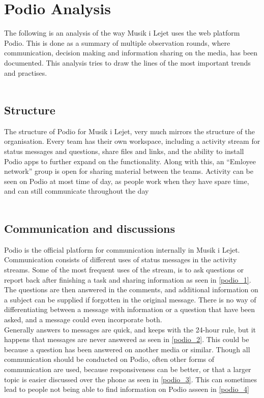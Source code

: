 \section{Podio Analysis}
\label{podio}

The following is an analysis of the way Musik i Lejet uses the web platform Podio. This is done as a summary of multiple observation rounds, where communication, decision making and information sharing on the media, has been documented. This analysis tries to draw the lines of the most important trends and practises. \\ \\

\subsection{Structure}
\label{podio_struc}
The structure of Podio for Musik i Lejet, very much mirrors the structure of the organisation. Every team has their own workspace, including a activity stream for status messages and questions, share files and links, and the ability to install Podio apps to further expand on the functionality. Along with this, an ``Emloyee network'' group is open for sharing material between the teams. Activity can be seen on Podio at most time of day, as people work when they have spare time, and can still communicate throughout the day\\ \\

\subsection{Communication and discussions}
\label{podio_com}
Podio is the official platform for communication internally in Musik i Lejet. Communication consists of different uses of status messages in the activity streams. Some of the most frequent uses of the stream, is to ask questions or report back after finishing a task and sharing information as seen in \ref{podio_1}. The questions are then answered in the comments, and additional information on a subject can be supplied if forgotten in the original message. There is no way of differentiating between a message with information or a question that have been asked, and a message could even incorporate both. \\

Generally answers to messages are quick, and keeps with the 24-hour rule, but it happens that messages are never answered as seen in \ref{podio_2}. This could be because a question has been answered on another media or similar. Though all communication should be conducted on Podio, often other forms of communication are used, because responsiveness can be better, or that a larger topic is easier discussed over the phone as seen in \ref{podio_3}. This can sometimes lead to people not being able to find information on Podio asseen in \ref{podio_4}\\

